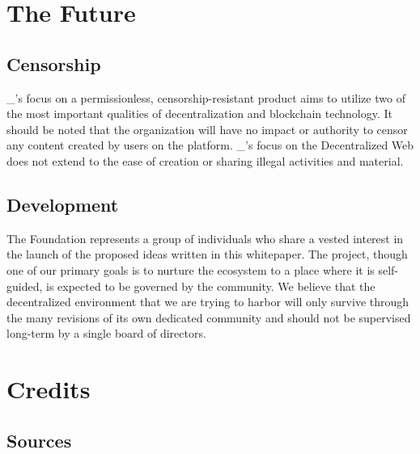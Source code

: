\documentclass{kwp-builder}
\begin{document}

\newpage

\section{The Future}
\subsection{Censorship}

\tab \konjure\_{’}s focus on a permissionless, censorship-resistant product aims to utilize two of the most important qualities of decentralization and blockchain technology. It should be noted that the \konjure organization will have no impact or authority to censor any content created by users on the platform. \konjure\_{’}s focus on the Decentralized Web does not extend to the ease of creation or sharing illegal activities and material.

\subsection{Development}

\tab The \konjure Foundation represents a group of individuals who share a vested interest in the launch of the proposed ideas written in this whitepaper. The \konjure project, though one of our primary goals is to nurture the ecosystem to a place where it is self-guided, is expected to be governed by the community. We believe that the decentralized environment that we are trying to harbor will only survive through the many revisions of its own dedicated community and should not be supervised long-term by a single board of directors.


\section{Credits}
\subsection{Sources}
\end{document}
